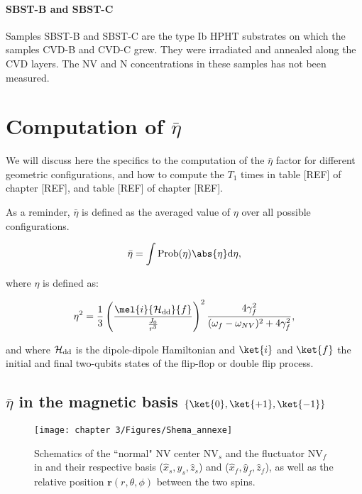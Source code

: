 \documentclass[a4paper, 11pt]{book}
\begin{document}
\subsubsection{SBST-B and SBST-C}
Samples SBST-B and SBST-C are the type Ib HPHT substrates on which the samples CVD-B and CVD-C grew. They were irradiated and annealed along the CVD layers. The NV and N concentrations in these samples has not been measured.

\chapter{Computation of $\bar \eta$}
We will discuss here the specifics to the computation of the  $\bar \eta$ factor for different geometric configurations, and how to compute the $T_1$ times in table [REF] of chapter [REF], and table [REF] of chapter [REF].

As a reminder, $\bar \eta$ is defined as the averaged value of $\eta$ over all possible configurations.

\begin{equation}
\bar \eta = \int \rm{Prob}(\eta) \abs{\eta} d\eta,
\end{equation}

where $\eta$ is defined as:

\begin{equation}
\label{eq. eta debut annexe}
\eta^2=\frac{1}{3} \left(\frac{\mel{i}{\mathcal{H_{\rm dd}}}{f}}{\frac{J_0}{r^3}}\right)^2 \frac{4\gamma_f^2}{(\omega_f - \omega_{NV})^2+4\gamma_f^2},
\end{equation}

and where $\mathcal{H_{\rm dd}}$ is the dipole-dipole Hamiltonian and $\ket{i}$ and $\ket{f}$ the initial and final two-qubits states of the flip-flop or double flip process.

\section{$\bar \eta$ in the magnetic basis $\{ \ket{0}, \ket{+1}, \ket{-1}\}$}

\begin{figure}[h]
\centering
\texttt{[image: chapter 3/Figures/Shema\_annexe]}
\caption{Schematics of the ``normal" NV center NV$_s$ and the fluctuator NV$_f$ in and their respective basis ($\hat x_s,\hat y_s,\hat z_s$) and ($\hat x_f,\hat y_f,\hat z_f$), as well as the relative position $\mathbf{r}(r,\theta,\phi)$ between the two spins.}
\label{shema spins annexe}
\end{figure}
\end{document}
